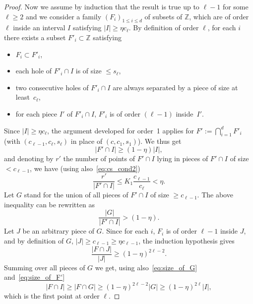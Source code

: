 \documentclass[10pt]{amsart}
\theoremstyle{definition}\newtheorem{defi}[theo]{Definition}\newtheorem{rema}[theo]{Remark}\newtheorem{exam}[theo]{Example}\newtheorem{exem}[theo]{Example}\newtheorem{nota}[theo]{Notation}
\newcommand{\egdef}{:=}
\newcommand{\ZZ}{\mathbb{Z}}
\begin{document}
\begin{proof}
Now we assume by induction that the result is true up to $\ell-1$ for some $\ell\ge2$ and we consider a family $(F_i)_{1\le i\le d}$ of subsets of $\ZZ$, which are of order $\ell$ inside an interval $I$ satisfying $|I|\ge \eta c_\ell$. By definition of order $\ell$, for each $i$ there exists a subset $F'_i\subset\ZZ$ satisfying
\begin{itemize}
\item $F_i\subset F'_i$,
\item each hole of $F'_i\cap I$ is of size $\le s_\ell$,
\item two consecutive holes of $F'_i\cap I$ are always separated by a piece of size at least~$c_\ell$,
\item for each piece $I'$ of $F'_i\cap I$, $F'_i$ is of order $(\ell-1)$ inside~$I'$.
\end{itemize}
Since $|I|\ge \eta c_\ell$, the argument developed for order~1 applies for $F'\egdef \bigcap_{i=1}^d F'_i$ (with $(c_{\ell-1},c_\ell,s_\ell)$ in place of $(c,c_1,s_1)$). We thus get
\begin{equation}\label{eq:size_of_F'}
|F'\cap I| \ge (1-\eta)|I|,
\end{equation}
and denoting by $r'$ the number of points of $F'\cap I$ lying in pieces of $F'\cap I$ of size $<c_{\ell-1}$, we have (using also~\eqref{eq:cs_cond2})
\begin{equation}\label{eq:r'}
\frac{r'}{|F'\cap I|} \le K_1 \frac{c_{\ell-1}}{c_\ell}<\eta.
\end{equation}
Let $G$ stand for the union of all pieces of $F'\cap I$ of size $\ge c_{\ell-1}$. The above inequality can be rewritten as
\begin{equation}\label{eq:size_of_G}
\frac{|G|}{|F'\cap I|} > (1-\eta).
\end{equation}
Let $J$ be an arbitrary piece of $G$. Since for each $i$, $F_i$ is of order $\ell-1$ inside $J$, and by definition of $G$, $|J|\ge c_{\ell-1}\ge \eta c_{\ell-1}$, the induction hypothesis gives
\[
\frac{|F\cap J|}{|J|} \ge (1-\eta)^{2{\ell-2}}.
\]
Summing over all pieces of $G$ we get, using also~\eqref{eq:size_of_G} and~\eqref{eq:size_of_F'}
\begin{equation}\label{eq:density}
|F\cap I|\ge |F\cap G| \ge (1-\eta)^{2{\ell-2}} |G| \ge (1-\eta)^{2\ell}|I|,
\end{equation}
which is the first point at order $\ell$.


\end{proof}
\end{document}
